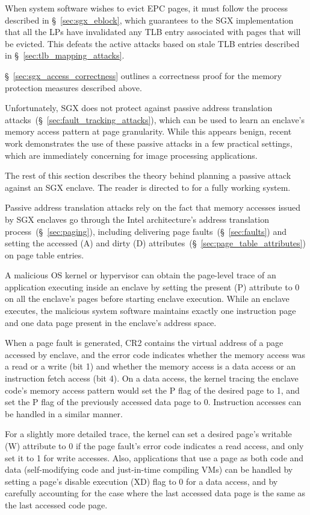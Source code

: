When system software wishes to evict EPC pages, it must follow the process
described in \S~\ref{sec:sgx_eblock}, which guarantees to the SGX
implementation that all the LPs have invalidated any TLB entry associated with
pages that will be evicted. This defeats the active attacks based on stale TLB
entries described in \S~\ref{sec:tlb_mapping_attacks}.

\S~\ref{sec:sgx_access_correctness} outlines a correctness proof for the memory
protection measures described above.

Unfortunately, SGX does not protect against passive address translation
attacks~(\S~\ref{sec:fault_tracking_attacks}), which can be used to learn an
enclave's memory access pattern at page granularity. While this appears
benign, recent work \cite{xu2015pagefaults} demonstrates the use of these
passive attacks in a few practical settings, which are immediately concerning
for image processing applications.

The rest of this section describes the theory behind planning a passive attack
against an SGX enclave. The reader is directed to \cite{xu2015pagefaults} for
a fully working system.

Passive address translation attacks rely on the fact that memory accesses
issued by SGX enclaves go through the Intel architecture's address translation
process~(\S~\ref{sec:paging}), including delivering page
faults~(\S~\ref{sec:faults}) and setting the accessed (A) and dirty (D)
attributes~(\S~\ref{sec:page_table_attributes}) on page table entries.

A malicious OS kernel or hypervisor can obtain the page-level trace of an
application executing inside an enclave by setting the present (P) attribute to
0 on all the enclave's pages before starting enclave execution. While an
enclave executes, the malicious system software maintains exactly one
instruction page and one data page present in the enclave's address space.

When a page fault is generated, CR2 contains the virtual address of a page
accessed by enclave, and the error code indicates whether the memory access was
a read or a write (bit 1) and whether the memory access is a data access or
an instruction fetch access (bit 4). On a data access, the kernel tracing the
enclave code's memory access pattern would set the P flag of the desired page
to 1, and set the P flag of the previously accessed data page to 0. Instruction
accesses can be handled in a similar manner.

For a slightly more detailed trace, the kernel can set a desired page's
writable (W) attribute to 0 if the page fault's error code indicates a read
access, and only set it to 1 for write accesses. Also, applications that use a
page as both code and data (self-modifying code and just-in-time compiling VMs)
can be handled by setting a page's disable execution (XD) flag to 0 for a data
access, and by carefully accounting for the case where the last accessed data
page is the same as the last accessed code page.

